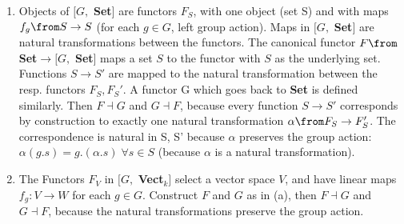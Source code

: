	\begin{answer}
		\begin{enumerate}
			\item Objects of $[G,$ \textbf{Set}$]$ are functors $F_S$, with one object (set S) and with maps $f_g \from S\to S$ (for each $g \in G$, left group action). Maps in  $[G,$ \textbf{Set}$]$ are natural transformations between the functors. The canonical functor $F \from$ \textbf{Set}$ \to [G,$ \textbf{Set}$]$ maps a set $S$ to the functor with $S$ as the underlying set. Functions $S\to S' $ are mapped to the natural transformation between the resp. functors $F_S, F_S'$. A functor G which goes back to \textbf{Set} is defined similarly. Then $F \dashv G$ and $G \dashv F$, because every function $S \to S'$ corresponds by construction to exactly one natural transformation $\alpha \from F_S \to F_S'$. The correspondence is natural in S, S' because $\alpha$ preserves the group action: $\alpha (g . s) = g . (\alpha . s)\; \forall s \in S$ (because $\alpha$ is a natural transformation).
			
			\item The Functors $F_V$ in  $[G,$ \textbf{Vect}$_k]$ select a vector space $V$, and have linear maps $f_g: V \to W$ for each $g \in G$. Construct $F$ and $G$ as in (a), then  $F \dashv G$ and $G \dashv F$, because the natural transformations preserve the group action.
		\end{enumerate}
	\end{answer}
	
	
	


